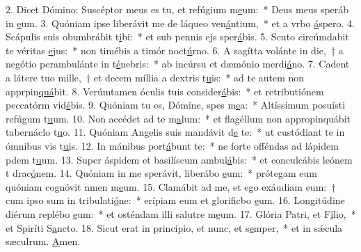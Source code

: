 2. Dicet Dómino: Suscéptor meus es tu, et refúgium m\uline{e}um:~* Deus meus speráb in \uline{e}um.
3. Quóniam ipse liberávit me de láqueo ven\uline{á}ntium,~* et a vrbo \uline{á}spero.
4. Scápulis suis obumbrábit t\uline{i}bi:~* et sub pennis ejs sper\uline{á}bis.
5. Scuto circúmdabit te véritas \uline{e}jus:~* non timébis a timór noct\uline{ú}rno.
6. A sagítta volánte in die,~† a negótio perambulánte in t\uline{é}nebris:~* ab incúrsu et dæmónio merdi\uline{á}no.
7. Cadent a látere tuo mille,~† et decem míllia a dextris t\uline{u}is:~* ad te autem non apprpin\uline{quá}bit.
8. Verúmtamen óculis tuis consider\uline{á}bis:~* et retributiónem peccatórm vid\uline{é}bis.
9. Quóniam tu es, Dómine, spes m\uline{e}a:~* Altíssimum posuísti refúgum t\uline{u}um.
10. Non accédet ad te m\uline{a}lum:~* et flagéllum non appropinquábit tabernáclo t\uline{u}o.
11. Quóniam Angelis suis mandávit d\uline{e} te:~* ut custódiant te in ómnibus vis t\uline{u}is.
12. In mánibus port\uline{á}bunt te:~* ne forte offéndas ad lápidem pdem t\uline{u}um.
13. Super áspidem et basilíscum ambul\uline{á}bis:~* et conculcábis leónem t drac\uline{ó}nem.
14. Quóniam in me sperávit, liberábo \uline{e}um:~* prótegam eum quóniam cognóvit nmen m\uline{e}um.
15. Clamábit ad me, et ego exáudiam eum:~† cum ipso sum in tribulati\uline{ó}ne:~* erípiam eum et glorificbo \uline{e}um.
16. Longitúdine diérum replébo \uline{e}um:~* et osténdam illi salutre m\uline{e}um.
17. Glória Patri, et F\uline{í}lio,~* et Spiríti S\uline{a}ncto.
18. Sicut erat in princípio, et nunc, et s\uline{e}mper,~* et in sǽcula sæculrum. \uline{A}men.
